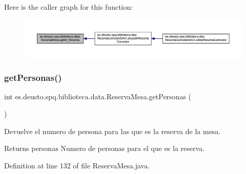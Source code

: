 Here is the caller graph for this function\+:
\nopagebreak
\begin{figure}[H]
\begin{center}
\leavevmode
\includegraphics[width=350pt]{classes_1_1deusto_1_1spq_1_1biblioteca_1_1data_1_1_reserva_mesa_a9ac2f729f34f52d30c24c36a594d25d7_icgraph}
\end{center}
\end{figure}
\mbox{\label{classes_1_1deusto_1_1spq_1_1biblioteca_1_1data_1_1_reserva_mesa_a8f8ba1a928ae9fae7ae63785fdd06814}} 
\subsubsection{\texorpdfstring{get\+Personas()}{getPersonas()}}
{\footnotesize\ttfamily int es.\+deusto.\+spq.\+biblioteca.\+data.\+Reserva\+Mesa.\+get\+Personas (\begin{DoxyParamCaption}{ }\end{DoxyParamCaption})}

Devuelve el numero de persona para las que es la reserva de la mesa. \begin{DoxyReturn}{Returns}
personas Numero de personas para el que es la reserva. 
\end{DoxyReturn}


Definition at line 132 of file Reserva\+Mesa.\+java.

